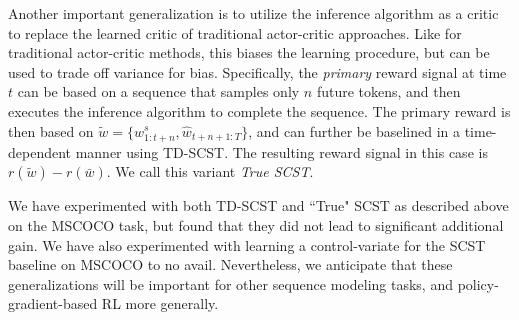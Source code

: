 \documentclass[10pt,twocolumn,letterpaper]{article}
\begin{document}
Another important generalization is to utilize the inference algorithm as a critic to replace the learned critic of traditional actor-critic approaches. Like for traditional actor-critic methods, this biases the learning procedure, but can be used to trade off variance for bias. Specifically, the \emph{primary} reward signal at time $t$ can be based on a sequence that samples only $n$ future tokens, and then executes the inference algorithm to complete the sequence. The primary reward is then based on $\tilde{w} = \{w^s_{1:t+n}, \hat{w}_{t+n+1:T}\}$, and can further be baselined in a time-dependent manner using TD-SCST. The resulting reward signal in this case is $r(\tilde{w} )-r(\bar{w})$. We call this variant \emph{True SCST}.

We have experimented with both TD-SCST and ``True" SCST as described above on the MSCOCO task, but found that they did not lead to significant additional gain. We have also experimented with learning a control-variate for the SCST baseline on MSCOCO to no avail. Nevertheless, we anticipate that these generalizations will be important for other sequence modeling tasks, and policy-gradient-based RL more generally.



\end{document}
